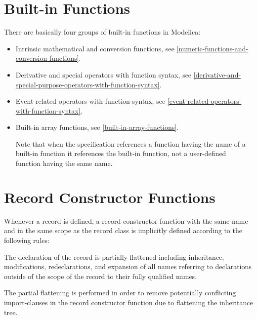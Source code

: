 \section{Built-in Functions}\label{built-in-functions}

There are basically four groups of built-in functions in Modelica:
\begin{itemize}
\item
  Intrinsic mathematical and conversion functions, see \cref{numeric-functions-and-conversion-functions}.
\item
  Derivative and special operators with function syntax,
  see \cref{derivative-and-special-purpose-operators-with-function-syntax}.
\item
  Event-related operators with function syntax, see \cref{event-related-operators-with-function-syntax}.
\item
  Built-in array functions, see \cref{built-in-array-functions}.

  Note that when the specification references a function having the name
  of a built-in function it references the built-in function, not a
  user-defined function having the same name.
\end{itemize}

\section{Record Constructor Functions}\label{record-constructor-functions}

Whenever a record is defined, a record constructor function with the
same name and in the same scope as the record class is implicitly
defined according to the following rules:

The declaration of the record is partially flattened including inheritance, modifications, redeclarations, and expansion of all names referring to declarations outside of the scope of the record to their fully qualified names.

\begin{nonnormative}
The partial flattening is performed in order to remove potentially conflicting import-clauses in the record constructor function due to flattening the inheritance tree.
\end{nonnormative}

